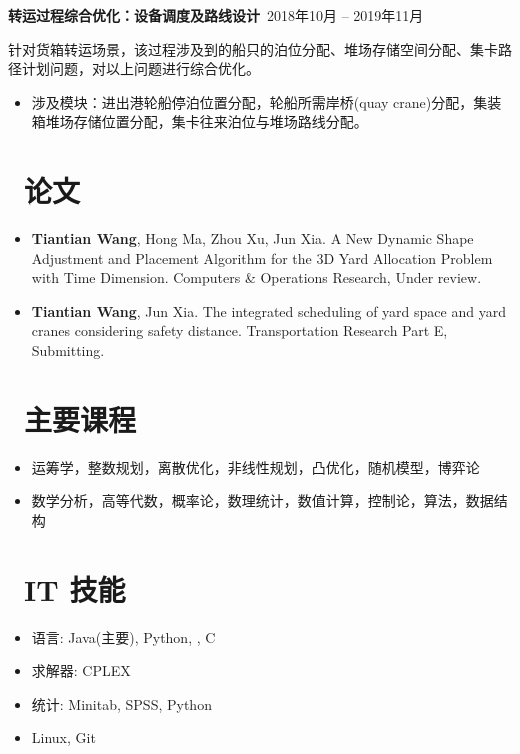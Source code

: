 \documentclass[11pt]{article}
\begin{document}
\textbf{转运过程综合优化：设备调度及路线设计}\  \hfill 2018年10月 -- 2019年11月

针对货箱转运场景，该过程涉及到的船只的泊位分配、堆场存储空间分配、集卡路径计划问题，对以上问题进行综合优化。

\begin{itemize}
  \item 涉及模块：进出港轮船停泊位置分配，轮船所需岸桥(quay crane)分配，集装箱堆场存储位置分配，集卡往来泊位与堆场路线分配。
\end{itemize}

\section{\makebox[\widthof{\faGraduationCap}][c]{\color{CVBlue}\faBookmarkO}\ 论文}
\begin{itemize}[parsep=0.5ex]
	\item \textbf{Tiantian Wang}, Hong Ma, Zhou Xu, Jun Xia. A New Dynamic Shape Adjustment and Placement Algorithm for the 3D Yard Allocation Problem with Time Dimension. Computers \& Operations Research, Under review.
	\item \textbf{Tiantian Wang}, Jun Xia. The integrated scheduling of yard space and yard cranes considering safety distance. Transportation Research Part E, Submitting.
\end{itemize}

\section{\makebox[\widthof{\faGraduationCap}][c]{\color{CVBlue}\faBook}\ 主要课程}
\begin{itemize}[parsep=0.5ex]
  \item 运筹学，整数规划，离散优化，非线性规划，凸优化，随机模型，博弈论
  \item 数学分析，高等代数，概率论，数理统计，数值计算，控制论，算法，数据结构
\end{itemize}

\section{\makebox[\widthof{\faGraduationCap}][c]{\color{CVBlue}\faCogs}\ IT 技能}
\begin{itemize}[parsep=0.5ex]
  \item 语言: Java(主要), Python, \Cpp, C
  \item 求解器: CPLEX
  \item 统计: Minitab, SPSS, Python
  \item Linux, Git
\end{itemize}
\end{document}
